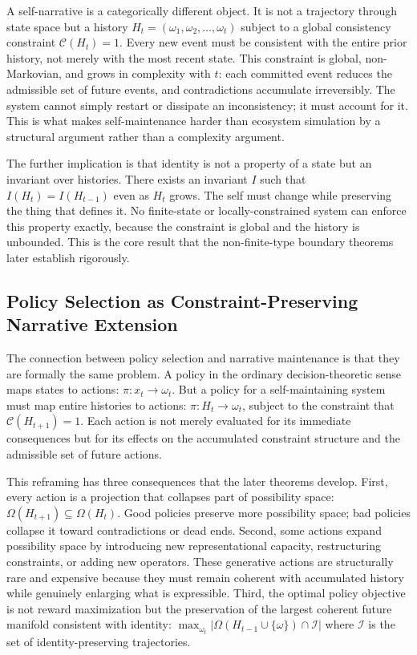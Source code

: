 \documentclass[12pt, a4paper]{article}
\theoremstyle{plain}
\theoremstyle{definition}
\theoremstyle{remark}
\begin{document}
A self-narrative is a categorically different object. It is not a trajectory through state space but a history $H_t = (\omega_1, \omega_2, \dots, \omega_t)$ subject to a global consistency constraint $\mathcal{C}(H_t) = 1$. Every new event must be consistent with the entire prior history, not merely with the most recent state. This constraint is global, non-Markovian, and grows in complexity with $t$: each committed event reduces the admissible set of future events, and contradictions accumulate irreversibly. The system cannot simply restart or dissipate an inconsistency; it must account for it. This is what makes self-maintenance harder than ecosystem simulation by a structural argument rather than a complexity argument.

The further implication is that identity is not a property of a state but an invariant over histories. There exists an invariant $I$ such that $I(H_t) = I(H_{t-1})$ even as $H_t$ grows. The self must change while preserving the thing that defines it. No finite-state or locally-constrained system can enforce this property exactly, because the constraint is global and the history is unbounded. This is the core result that the non-finite-type boundary theorems later establish rigorously.

\subsection{Policy Selection as Constraint-Preserving Narrative Extension}

The connection between policy selection and narrative maintenance is that they are formally the same problem. A policy in the ordinary decision-theoretic sense maps states to actions: $\pi : x_t \to \omega_t$. But a policy for a self-maintaining system must map entire histories to actions: $\pi : H_t \to \omega_t$, subject to the constraint that $\mathcal{C}(H_{t+1}) = 1$. Each action is not merely evaluated for its immediate consequences but for its effects on the accumulated constraint structure and the admissible set of future actions.

This reframing has three consequences that the later theorems develop. First, every action is a projection that collapses part of possibility space: $\Omega(H_{t+1}) \subseteq \Omega(H_t)$. Good policies preserve more possibility space; bad policies collapse it toward contradictions or dead ends. Second, some actions expand possibility space by introducing new representational capacity, restructuring constraints, or adding new operators. These generative actions are structurally rare and expensive because they must remain coherent with accumulated history while genuinely enlarging what is expressible. Third, the optimal policy objective is not reward maximization but the preservation of the largest coherent future manifold consistent with identity: $\max_{\omega_t} |\Omega(H_{t-1} \cup \{\omega\}) \cap \mathcal{I}|$ where $\mathcal{I}$ is the set of identity-preserving trajectories.
\end{document}
